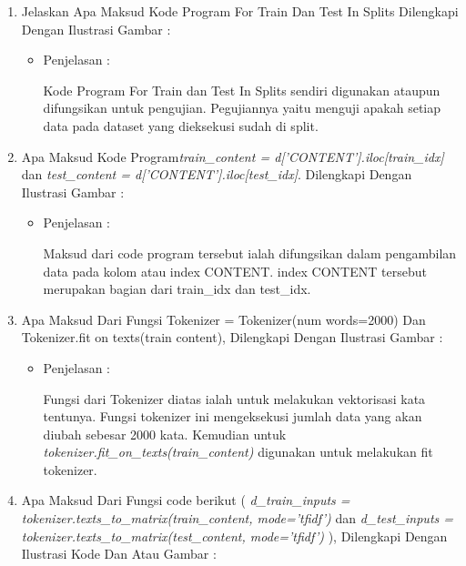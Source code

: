 \begin{enumerate}
\begin{itemize}
\par
\end{itemize}
\par
\par
\par
\item Jelaskan Apa Maksud Kode Program For Train Dan Test In Splits Dilengkapi Dengan Ilustrasi Gambar :
\begin{itemize}
\item Penjelasan	:
\par Kode Program For Train dan Test In Splits sendiri digunakan ataupun difungsikan untuk pengujian. Pegujiannya yaitu menguji apakah setiap data pada dataset yang dieksekusi sudah di split.
\par 
\par
\end{itemize}
\par
\item Apa Maksud Kode Program\emph{train\_content = d['CONTENT'].iloc[train\_idx]} dan \emph{test\_content = d['CONTENT'].iloc[test\_idx]}. Dilengkapi Dengan Ilustrasi Gambar :
\begin{itemize}
\item Penjelasan	:
\par Maksud dari code program tersebut ialah difungsikan dalam pengambilan data pada kolom atau index CONTENT. index CONTENT tersebut merupakan bagian dari train\_idx dan test\_idx.
\par
\par
\end{itemize}
\par
\item Apa Maksud Dari Fungsi Tokenizer = Tokenizer(num words=2000) Dan Tokenizer.fit on texts(train content), Dilengkapi Dengan Ilustrasi Gambar :
\begin{itemize}
\item Penjelasan	:
\par  Fungsi dari Tokenizer diatas ialah untuk melakukan vektorisasi kata tentunya. Fungsi tokenizer ini mengeksekusi jumlah data yang akan diubah sebesar 2000 kata. Kemudian untuk  \emph{tokenizer.fit\_on\_texts(train\_content)} digunakan untuk melakukan fit tokenizer.
\par
\par
\end{itemize}
\par
\item Apa Maksud Dari Fungsi code berikut ( \emph{d\_train\_inputs = tokenizer.texts\_to\_matrix(train\_content, mode='tfidf')} dan \emph{d\_test\_inputs = tokenizer.texts\_to\_matrix(test\_content, mode='tfidf')} ), Dilengkapi Dengan Ilustrasi Kode Dan Atau Gambar :

\end{enumerate}

